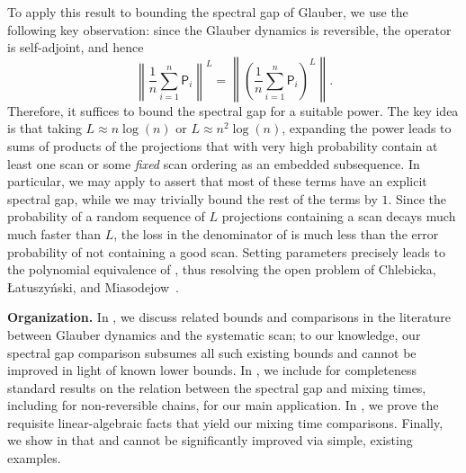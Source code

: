 \documentclass[11pt]{article}
\begin{document}
To apply this result to bounding the spectral gap of Glauber, we use the following key observation: since the Glauber dynamics is reversible, the operator is self-adjoint, and hence 
\begin{equation*}
        \left\|\frac{1}{n}\sum_{i=1}^n \mathsf{P}_i\right\|^L =\left\|\left(\frac{1}{n}\sum_{i=1}^n \mathsf{P}_i\right)^L\right\|.
    \end{equation*}
    Therefore, it suffices to bound the spectral gap for a suitable power. The key idea is that taking $L\approx n\log(n)$ or $L\approx n^2\log(n)$, expanding the power leads to sums of products of the projections that with very high probability contain at least one scan or some \emph{fixed} scan ordering as an embedded subsequence. In particular, we may apply  to assert that most of these terms have an explicit spectral gap, while we may trivially bound the rest of the terms by $1$. Since the probability of a random sequence of $L$ projections containing a scan decays much much faster than $L$, the loss in the denominator of  is much less than the error probability of not containing a good scan. Setting parameters precisely leads to the polynomial equivalence of , thus resolving the open problem of Chlebicka, Łatuszy\'nski, and Miasodejow~\cite{chlebicka}.


\noindent\textbf{Organization.} In , we discuss related bounds and comparisons in the literature between Glauber dynamics and the systematic scan; to our knowledge, our spectral gap comparison subsumes all such existing bounds and cannot be improved in light of known lower bounds. In , we include for completeness standard results on the relation between the spectral gap and mixing times, including for non-reversible chains, for our main application. In , we prove the requisite linear-algebraic facts that yield our mixing time comparisons. Finally, we show in  that  and  cannot be significantly improved via simple, existing examples.
\end{document}
